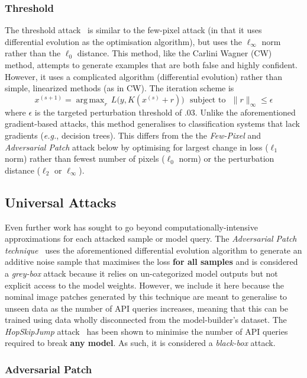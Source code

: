 \documentclass[journal]{IEEEtran}
\DeclareMathOperator*{\argmax}{arg\,max}
\begin{document}
\subsubsection{Threshold}
The threshold attack~\cite{pixelattack} is similar to the few-pixel attack (in that it uses differential evolution as the optimisation algorithm), but uses the $\ell_{\infty}$ norm rather than the $\ell_0$ distance.
This method, like the Carlini Wagner (CW) method, attempts to generate examples that are both false and highly confident.
However, it uses a complicated algorithm (differential evolution) rather than simple, linearized methods (as in CW).
The iteration scheme is
$$
    x^{(s+1)} = \argmax_r \, L\big(y, K(x^{(s)} + r)\big) \text{~~subject~to~~}  \|r\|_{\infty} \leq \epsilon
$$
where $\epsilon$ is the targeted perturbation threshold of .03.
Unlike the aforementioned gradient-based attacks, this method generalises to classification systems that lack gradients (\textit{e.g.}, decision trees).
This differs from the the \textit{Few-Pixel} and \textit{Adversarial Patch} attack below by optimising for largest change in loss ($\ell_{1}$ norm) rather than fewest number of pixels ($\ell_{0}$ norm) or the perturbation distance ($\ell_2$ or $\ell_{\infty}$).

\subsection{Universal Attacks}
\label{universal}

Even further work has sought to go beyond computationally-intensive approximations for each attacked sample or model query.
The \textit{Adversarial Patch technique}~\cite{adversarialpatch} uses the aforementioned differential evolution algorithm to generate an additive noise sample that maximises the loss \textbf{for all samples} and is considered a \textit{grey-box} attack because it relies on un-categorized model outputs but not explicit access to the model weights.
However, we include it here because the nominal image patches generated by this technique are meant to generalise to unseen data as the number of API queries increases, meaning that this can be trained using data wholly disconnected from the model-builder's dataset.
The \textit{HopSkipJump} attack~\cite{hopskipjump} has been shown to minimise the number of API queries required to break \textbf{any model}.
As such, it is considered a \textit{black-box} attack.



\subsubsection{Adversarial Patch}
\end{document}
